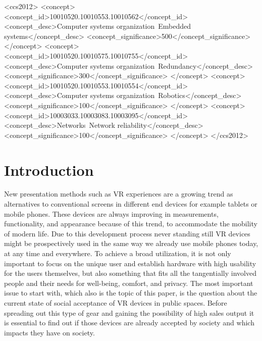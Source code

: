 \documentclass[sigchi]{acmart}
\begin{document}
\begin{CCSXML}
<ccs2012>
 <concept>
  <concept_id>10010520.10010553.10010562</concept_id>
  <concept_desc>Computer systems organization~Embedded systems</concept_desc>
  <concept_significance>500</concept_significance>
 </concept>
 <concept>
  <concept_id>10010520.10010575.10010755</concept_id>
  <concept_desc>Computer systems organization~Redundancy</concept_desc>
  <concept_significance>300</concept_significance>
 </concept>
 <concept>
  <concept_id>10010520.10010553.10010554</concept_id>
  <concept_desc>Computer systems organization~Robotics</concept_desc>
  <concept_significance>100</concept_significance>
 </concept>
 <concept>
  <concept_id>10003033.10003083.10003095</concept_id>
  <concept_desc>Networks~Network reliability</concept_desc>
  <concept_significance>100</concept_significance>
 </concept>
</ccs2012>
\end{CCSXML}




\maketitle

\section{Introduction}
New presentation methods such as VR experiences are a growing trend as alternatives to conventional screens in different end devices for example tablets or mobile phones. These devices are always improving in measurements, functionality, and appearance because of this trend, to accommodate the mobility of modern life. Due to this development process never standing still VR devices might be prospectively used in the same way we already use mobile phones today, at any time and everywhere. To achieve a broad utilization, it is not only important to focus on the unique user and establish hardware with high usability for the users themselves, but also something that fits all the tangentially involved people and their needs for well-being, comfort, and privacy. The most important issue to start with, which also is the topic of this paper, is the question about the current state of social acceptance of VR devices in public spaces. Before spreading out this type of gear and gaining the possibility of high sales output it is essential to find out if those devices are already accepted by society and which impacts they have on society.
\end{document}
